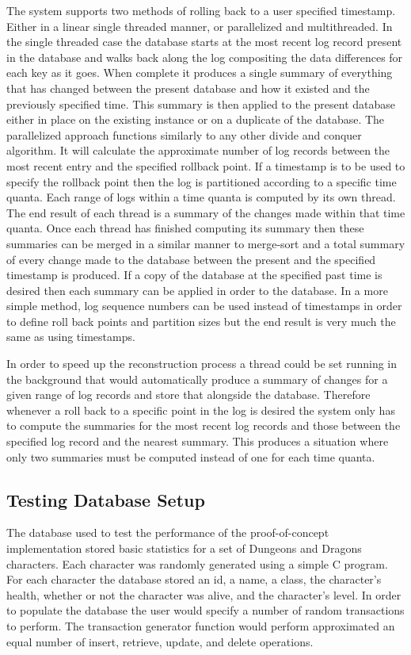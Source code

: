 \documentclass{article}
\begin{document}
The system supports two methods of rolling back to a user specified timestamp. Either in a linear single threaded manner, or parallelized and multithreaded. In the single threaded case the database starts at the most recent log record present in the database and walks back along the log compositing the data differences for each key as it goes. When complete it produces a single summary of everything that has changed between the present database and how it existed and the previously specified time. This summary is then applied to the present database either in place on the existing instance or on a duplicate of the database. The parallelized approach functions similarly to any other divide and conquer algorithm. It will calculate the approximate number of log records between the most recent entry and the specified rollback point. If a timestamp is to be used to specify the rollback point then the log is partitioned according to a specific time quanta. Each range of logs within a time quanta is computed by its own thread. The end result of each thread is a summary of the changes made within that time quanta. Once each thread has finished computing its summary then these summaries can be merged in a similar manner to merge-sort and a total summary of every change made to the database between the present and the specified timestamp is produced. If a copy of the database at the specified past time is desired then each summary can be applied in order to the database. In a more simple method, log sequence numbers can be used instead of timestamps in order to define roll back points and partition sizes  but the end result is very much the same as using timestamps.

In order to speed up the reconstruction process a thread could be set running in the background that would automatically produce a summary of changes for a given range of log records and store that alongside the database. Therefore whenever a roll back to a specific point in the log is desired the system only has to compute the summaries for the most recent log records and those between the specified log record and the nearest summary. This produces a situation where only two summaries must be computed instead of one for each time quanta.

\subsection{Testing Database Setup}

The database used to test the performance of the proof-of-concept implementation stored basic statistics for a set of Dungeons and Dragons characters. Each character was randomly generated using a simple C program. For each character the database stored an id, a name, a class, the character's health, whether or not the character was alive, and the character's level. In order to populate the database the user would specify a number of random transactions to perform. The transaction generator function would perform approximated an equal number of insert, retrieve, update, and delete operations.
\end{document}
